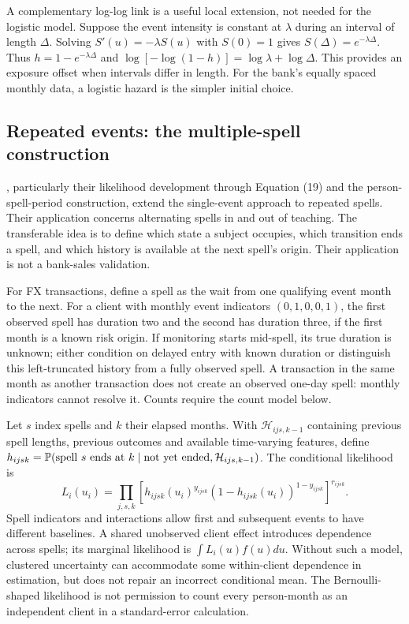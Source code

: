 A complementary log-log link is a useful local extension, not needed for the logistic model. Suppose the event intensity is constant at $\lambda$ during an interval of length $\Delta$. Solving $S'(u)=-\lambda S(u)$ with $S(0)=1$ gives $S(\Delta)=e^{-\lambda\Delta}$. Thus $h=1-e^{-\lambda\Delta}$ and $\log[-\log(1-h)]=\log\lambda+\log\Delta$. This provides an exposure offset when intervals differ in length. For the bank's equally spaced monthly data, a logistic hazard is the simpler initial choice.

\subsection{Repeated events: the multiple-spell construction}

\citet{willett1995multiple}, particularly their likelihood development through Equation (19) and the person-spell-period construction, extend the single-event approach to repeated spells. Their application concerns alternating spells in and out of teaching. The transferable idea is to define which state a subject occupies, which transition ends a spell, and which history is available at the next spell's origin. Their application is not a bank-sales validation.

For FX transactions, define a spell as the wait from one qualifying event month to the next. For a client with monthly event indicators $(0,1,0,0,1)$, the first observed spell has duration two and the second has duration three, if the first month is a known risk origin. If monitoring starts mid-spell, its true duration is unknown; either condition on delayed entry with known duration or distinguish this left-truncated history from a fully observed spell. A transaction in the same month as another transaction does not create an observed one-day spell: monthly indicators cannot resolve it. Counts require the count model below.

Let $s$ index spells and $k$ their elapsed months. With $\mathcal H_{ijs,k-1}$ containing previous spell lengths, previous outcomes and available time-varying features, define $h_{ijsk}=\mathbb{P}(\text{spell }s\text{ ends at }k\mid\text{not yet ended},\mathcal H_{ijs,k-1})$. The conditional likelihood is
\begin{equation}
 L_i(u_i)=\prod_{j,s,k}\left[h_{ijsk}(u_i)^{y_{ijsk}}
                          (1-h_{ijsk}(u_i))^{1-y_{ijsk}}\right]^{r_{ijsk}}.
 \label{eq:recurrent}
\end{equation}
Spell indicators and interactions allow first and subsequent events to have different baselines. A shared unobserved client effect introduces dependence across spells; its marginal likelihood is $\int L_i(u)f(u)du$. Without such a model, clustered uncertainty can accommodate some within-client dependence in estimation, but does not repair an incorrect conditional mean. The Bernoulli-shaped likelihood is not permission to count every person-month as an independent client in a standard-error calculation.


